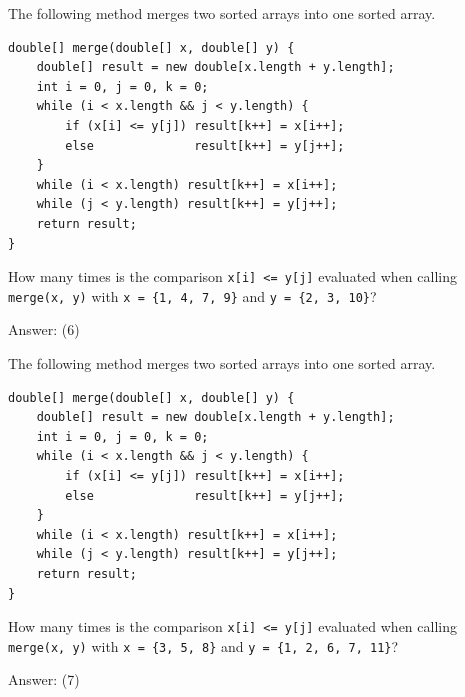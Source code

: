 \begin{question}
The following method merges two sorted arrays into one sorted array.

\begin{lstlisting}
double[] merge(double[] x, double[] y) {
    double[] result = new double[x.length + y.length];
    int i = 0, j = 0, k = 0;
    while (i < x.length && j < y.length) {
        if (x[i] <= y[j]) result[k++] = x[i++];
        else              result[k++] = y[j++];
    }
    while (i < x.length) result[k++] = x[i++];
    while (j < y.length) result[k++] = y[j++];
    return result;
}
\end{lstlisting}

How many times is the comparison \lstinline|x[i] <= y[j]| evaluated when calling \lstinline|merge(x, y)| with \lstinline|x = {1, 4, 7, 9}| and \lstinline|y = {2, 3, 10}|?

Answer: \underline{\hspace{1in}} \ifanswers (6)\fi
\end{question}

\begin{question}
The following method merges two sorted arrays into one sorted array.

\begin{lstlisting}
double[] merge(double[] x, double[] y) {
    double[] result = new double[x.length + y.length];
    int i = 0, j = 0, k = 0;
    while (i < x.length && j < y.length) {
        if (x[i] <= y[j]) result[k++] = x[i++];
        else              result[k++] = y[j++];
    }
    while (i < x.length) result[k++] = x[i++];
    while (j < y.length) result[k++] = y[j++];
    return result;
}
\end{lstlisting}

How many times is the comparison \lstinline|x[i] <= y[j]| evaluated when calling \lstinline|merge(x, y)| with \lstinline|x = {3, 5, 8}| and \lstinline|y = {1, 2, 6, 7, 11}|?

Answer: \underline{\hspace{1in}} \ifanswers (7)\fi
\end{question}


